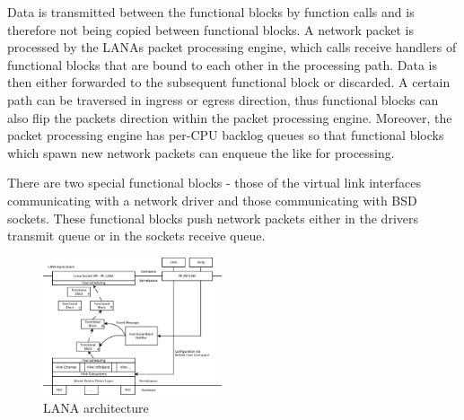 \documentclass{sig-alternate}
\begin{document}
Data is transmitted between the functional blocks by function calls and is 
therefore not being copied between functional blocks. A network packet is 
processed by the LANAs packet processing engine, which calls receive handlers 
of functional blocks that are bound to each other in the processing path. Data is then 
either forwarded to the subsequent functional block or discarded. A certain
path can be traversed in ingress or egress direction, thus functional
blocks can also flip the packets direction within the packet processing engine.
Moreover, the packet processing engine has per-CPU backlog queues so that
functional blocks which spawn new network packets can enqueue the like for
processing.

There are two special functional blocks - those of the virtual link interfaces 
communicating with a network driver and those communicating with BSD sockets.
These functional blocks push network packets either in the drivers transmit 
queue or in the sockets receive queue.

\begin{figure}
\centering
\includegraphics[width=0.47\textwidth]{figures/architecture.pdf}
\caption{LANA architecture}
\label{fig:architecture}
\end{figure}

\end{document}
